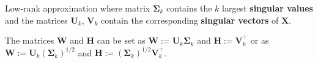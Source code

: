 \begin{vbframe}{Low-rank approximation}
where matrix $\boldsymbol{\Sigma}_k$ contains the $k$ largest \textbf{singular values} and the matrices $\mathbf{U}_k$, $\mathbf{V}_k$ contain the corresponding \textbf{singular vectors} of $\mathbf{X}$. 

\lz 

The matrices $\bm{W}$ and $\bm{H}$ can be set as $\bm{W}:= \mathbf{U}_k \boldsymbol{\Sigma}_k$ and $\bm{H}:= \mathbf{V}_k^\top$ or as $\bm{W}:= \mathbf{U}_k (\boldsymbol{\Sigma}_k)^{1 / 2}$ and $\bm{H}:= (\boldsymbol{\Sigma}_k)^{1 / 2}\mathbf{V}_k^\top$. 

\end{vbframe}



\endlecture








